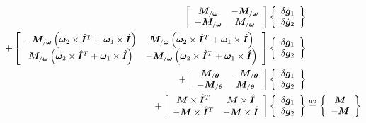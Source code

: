 \documentclass[10pt,dvips,fleqn,subeqn]{report}
\newcommand{\T}[1]{\bm{#1}}
\newcommand{\equu}{\overset{\text{uu}}{=}}
\begin{document}
\begin{align}
	\sqbr{\matr{cc}{
		\T{M}_{/\T{\omega}} & - \T{M}_{/\T{\omega}} \\
		- \T{M}_{/\T{\omega}} & \T{M}_{/\T{\omega}}
	}} \cubr{\cvvect{
		\delta\dot{\T{g}}_1 \\
		\delta\dot{\T{g}}_2
	}} & \nonumber \\
	+ \sqbr{\matr{cc}{
		- \T{M}_{/\T{\omega}} \plbr{\T{\omega}_2 \times \hat{\T{I}}^T + \T{\omega}_1\times \hat{\T{I}}}
			& \T{M}_{/\T{\omega}} \plbr{\T{\omega}_2 \times \hat{\T{I}}^T + \T{\omega}_1\times \hat{\T{I}}} \\
		\T{M}_{/\T{\omega}} \plbr{\T{\omega}_2\times \hat{\T{I}}^T + \T{\omega}_1\times \hat{\T{I}}}
			& - \T{M}_{/\T{\omega}} \plbr{\T{\omega}_2 \times \hat{\T{I}}^T + \T{\omega}_1\times \hat{\T{I}}}
	}} \cubr{\cvvect{
		\delta\T{g}_1 \\
		\delta\T{g}_2
	}} & \nonumber \\
	+ \sqbr{\matr{cc}{
		\T{M}_{/\T{\theta}} & - \T{M}_{/\T{\theta}} \\
		- \T{M}_{/\T{\theta}} & \T{M}_{/\T{\theta}}
	}} \cubr{\cvvect{
		\delta\T{g}_1 \\
		\delta\T{g}_2
	}} & \nonumber \\
	+ \sqbr{\matr{cc}{
		\T{M} \times \hat{\T{I}}^T & \T{M} \times \hat{\T{I}} \\
		- \T{M} \times \hat{\T{I}}^T & - \T{M} \times \hat{\T{I}}
	}} \cubr{\cvvect{
		\delta\T{g}_1 \\
		\delta\T{g}_2
	}} &\equu \cubr{\cvvect{
		\T{M} \\
		- \T{M}
	}}
\end{align}
\end{document}
